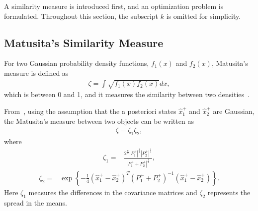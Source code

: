 \documentclass[letterpaper, 10pt, conference]{ieeeconf}
\begin{document}
A similarity measure is introduced first, and an optimization problem is formulated. Throughout this section, the subscript $k$ is omitted for simplicity. 







	
\subsection{Matusita's Similarity Measure}

For two Gaussian probability density functions, $f_1(x)$ and $f_2(x)$, Matusita's measure is defined as
\begin{align*}
\zeta = \int \sqrt{f_1(x)f_2(x)}dx,
\end{align*}
which is between 0 and 1, and it measures the similarity between two densities~\cite{Coal_k}. 

From~\cite{Coal_k}, using the assumption that the a posteriori states $\hat x_1^+$ and $\hat x_2^+$ are Gaussian, the Matusita's measure between two objects can be written as
\begin{align}
\zeta=\zeta_1\zeta_2,
\end{align}
where
\begin{align}
\label{Q}
\zeta_1=&\frac{2^\frac{n}{2}|P_1^+|^{\frac{1}{4}}|P_2^+|^{\frac{1}{4}}}{|P_1^++P_2^+|^{\frac{1}{2}}},
\end{align}
\begin{align}
\label{R}
\zeta_2=&\exp{\left\{-\frac{1}{4}(\hat x^+_1-\hat x^+_2)^T(P_1^++P_2^+)^{-1}(\hat x^+_1-\hat x^+_2)\right\}}.
\end{align}
Here $\zeta_1$ measures the differences in the covariance matrices and $\zeta_2$ represents the spread in the means.
	
\end{document}
